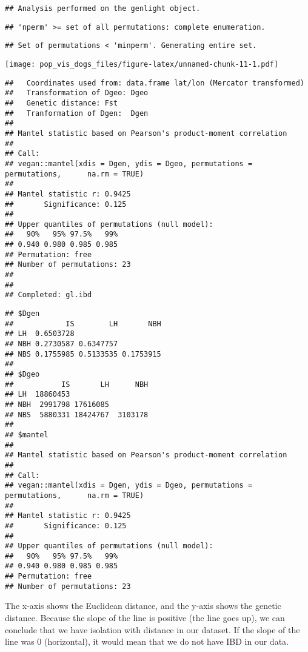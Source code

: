 \documentclass[
]{article}
\begin{document}
\begin{verbatim}
## Analysis performed on the genlight object.
\end{verbatim}

\begin{verbatim}
## 'nperm' >= set of all permutations: complete enumeration.
\end{verbatim}

\begin{verbatim}
## Set of permutations < 'minperm'. Generating entire set.
\end{verbatim}

\texttt{[image: pop\_vis\_dogs\_files/figure-latex/unnamed-chunk-11-1.pdf]}

\begin{verbatim}
##   Coordinates used from: data.frame lat/lon (Mercator transformed) 
##   Transformation of Dgeo: Dgeo 
##   Genetic distance: Fst 
##   Tranformation of Dgen:  Dgen 
## 
## Mantel statistic based on Pearson's product-moment correlation 
## 
## Call:
## vegan::mantel(xdis = Dgen, ydis = Dgeo, permutations = permutations,      na.rm = TRUE) 
## 
## Mantel statistic r: 0.9425 
##       Significance: 0.125 
## 
## Upper quantiles of permutations (null model):
##   90%   95% 97.5%   99% 
## 0.940 0.980 0.985 0.985 
## Permutation: free
## Number of permutations: 23
## 
## 
## Completed: gl.ibd
\end{verbatim}

\begin{verbatim}
## $Dgen
##            IS        LH       NBH
## LH  0.6503728                    
## NBH 0.2730587 0.6347757          
## NBS 0.1755985 0.5133535 0.1753915
## 
## $Dgeo
##           IS       LH      NBH
## LH  18860453                  
## NBH  2991798 17616085         
## NBS  5880331 18424767  3103178
## 
## $mantel
## 
## Mantel statistic based on Pearson's product-moment correlation 
## 
## Call:
## vegan::mantel(xdis = Dgen, ydis = Dgeo, permutations = permutations,      na.rm = TRUE) 
## 
## Mantel statistic r: 0.9425 
##       Significance: 0.125 
## 
## Upper quantiles of permutations (null model):
##   90%   95% 97.5%   99% 
## 0.940 0.980 0.985 0.985 
## Permutation: free
## Number of permutations: 23
\end{verbatim}

The x-axis shows the Euclidean distance, and the y-axis shows the
genetic distance. Because the slope of the line is positive (the line
goes up), we can conclude that we have isolation with distance in our
dataset. If the slope of the line was 0 (horizontal), it would mean that
we do not have IBD in our data.
\end{document}
